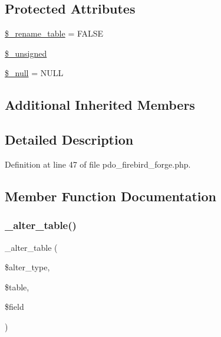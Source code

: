 \subsection*{Protected Attributes}
\begin{DoxyCompactItemize}
\item 
\mbox{\hyperlink{class_c_i___d_b__pdo__firebird__forge_a1a649e7cf9de16bcf932977b18bc91de}{\$\+\_\+rename\+\_\+table}} = F\+A\+L\+SE
\item 
\mbox{\hyperlink{class_c_i___d_b__pdo__firebird__forge_aae977ae6d61fa183f0b25422b6ddc31c}{\$\+\_\+unsigned}}
\item 
\mbox{\hyperlink{class_c_i___d_b__pdo__firebird__forge_ae58fe6a5104d4a069a49b27533ce808f}{\$\+\_\+null}} = \textquotesingle{}N\+U\+LL\textquotesingle{}
\end{DoxyCompactItemize}
\subsection*{Additional Inherited Members}


\subsection{Detailed Description}


Definition at line 47 of file pdo\+\_\+firebird\+\_\+forge.\+php.



\subsection{Member Function Documentation}
\mbox{\label{class_c_i___d_b__pdo__firebird__forge_a41c6cae02f2fda8b429ad0afb9509426}} 
\subsubsection{\texorpdfstring{\_alter\_table()}{\_alter\_table()}}
{\footnotesize\ttfamily \+\_\+alter\+\_\+table (\begin{DoxyParamCaption}\item[{}]{\$alter\+\_\+type,  }\item[{}]{\$table,  }\item[{}]{\$field }\end{DoxyParamCaption})\hspace{0.3cm}{\ttfamily [protected]}}

